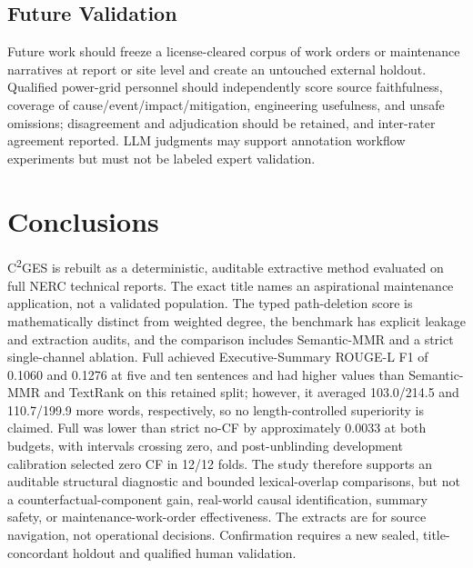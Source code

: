 \documentclass[applsci,article,submit,moreauthors]{Definitions/mdpi}
\newcommand{\cges}{C\textsuperscript{2}GES}
\begin{document}
\subsection{Future Validation}

Future work should freeze a license-cleared corpus of work orders or maintenance narratives at report or site level and create an untouched external holdout. Qualified power-grid personnel should independently score source faithfulness, coverage of cause/event/impact/mitigation, engineering usefulness, and unsafe omissions; disagreement and adjudication should be retained, and inter-rater agreement reported. LLM judgments may support annotation workflow experiments but must not be labeled expert validation.

\section{Conclusions}

\cges{} is rebuilt as a deterministic, auditable extractive method evaluated on full NERC technical reports. The exact title names an aspirational maintenance application, not a validated population. The typed path-deletion score is mathematically distinct from weighted degree, the benchmark has explicit leakage and extraction audits, and the comparison includes Semantic-MMR and a strict single-channel ablation. Full achieved Executive-Summary ROUGE-L F1 of 0.1060 and 0.1276 at five and ten sentences and had higher values than Semantic-MMR and TextRank on this retained split; however, it averaged 103.0/214.5 and 110.7/199.9 more words, respectively, so no length-controlled superiority is claimed. Full was lower than strict no-CF by approximately 0.0033 at both budgets, with intervals crossing zero, and post-unblinding development calibration selected zero CF in 12/12 folds. The study therefore supports an auditable structural diagnostic and bounded lexical-overlap comparisons, but not a counterfactual-component gain, real-world causal identification, summary safety, or maintenance-work-order effectiveness. The extracts are for source navigation, not operational decisions. Confirmation requires a new sealed, title-concordant holdout and qualified human validation.
\end{document}
